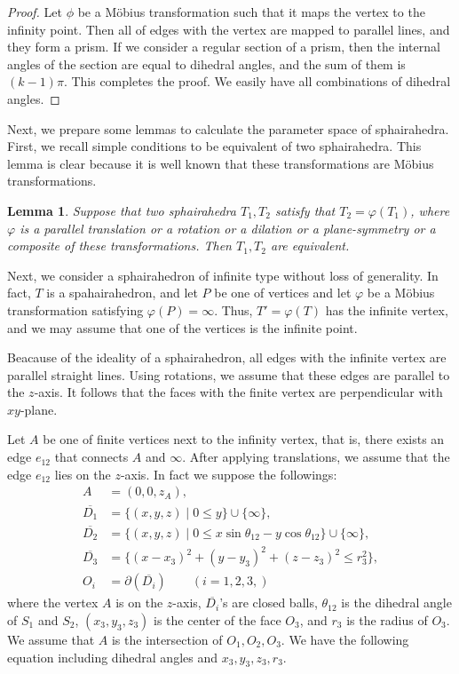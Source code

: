 \documentclass[suppldata, dvipdfmx]{interact}
\theoremstyle{plain}%
\newtheorem{lemma}[theorem]{Lemma}
\theoremstyle{definition}
\theoremstyle{remark}
\theoremstyle{problemstyle}
\begin{document}
\begin{proof}
 Let $\phi$ be a M\"obius transformation such that it maps the vertex to
 the infinity point. Then all of edges with the vertex are mapped to
 parallel lines, and they form a prism. If we consider a
 regular section of a prism, then the internal angles of the section 
 are equal to dihedral angles, and the sum of them is $(k-1)\pi$.  This
 completes the proof.  We easily have all combinations of dihedral angles.
\end{proof}

Next, we prepare some lemmas to calculate the parameter space of sphairahedra. First, we recall simple conditions to be equivalent of two sphairahedra.  This lemma is clear because it is well known that these transformations are M\"obius transformations. 

\begin{lemma} \label{lemma:equivalentOfSH}
Suppose that two sphairahedra $T_1, T_2$ satisfy that $T_2=\varphi(T_1)$, where $\varphi$ is a parallel translation or a rotation or a dilation or a plane-symmetry or a composite of these transformations.  Then $T_1, T_2$ are equivalent. 
\end{lemma}

Next, we consider a sphairahedron of infinite type without loss of generality.  In fact, $T$ is a spahairahedron, and  let $P$ be one of vertices and let $\varphi$ be a M\"obius transformation satisfying $\varphi(P)=\infty$.  Thus, $T'=\varphi(T)$ has the infinite vertex, and we may assume that one of the vertices is the infinite point.

Beacause of the ideality of a sphairahedron, all edges with the infinite vertex are parallel straight lines.  Using rotations, we assume that these edges are parallel to the $z$-axis.  It follows that the faces with the finite vertex are perpendicular with $xy$-plane.

Let $A$ be one of finite vertices next to the infinity vertex, that is, there exists an edge $e_{12}$ that connects $A$ and $\infty$.  After applying translations, we assume that the edge $e_{12}$ lies on the $z$-axis.  In fact we suppose the followings:
\begin{align*}
A &= (0,0,z_A),\\ 
\overline{D_1}  &= \{ (x,y,z) \mid 0 \le y \} \cup \{\infty\} ,\\
\overline{D_2}  &= \{ (x,y,z) \mid 0 \le x\sin\theta_{12} - y\cos\theta_{12} \}\cup \{\infty\} ,\\
\overline{D_3}  &= \{ (x-x_3)^2+(y-y_3)^2+(z-z_3)^2 \le r_3^2 \}, \\
O_i & = \partial(\overline{D_i}) \qquad(i=1,2,3,)
\end{align*}
where the vertex $A$ is on the $z$-axis, $\overline{D_i}$'s are closed balls, $\theta_{12}$ is the dihedral angle of $S_1$ and $S_2$,  $(x_3, y_3, z_3)$ is the center of the face $O_3$, and $r_3$ is the radius of $O_3$.  We assume that $A$ is the intersection of $O_1, O_2, O_3$.  We have the following equation including dihedral angles and  $x_3, y_3, z_3, r_3$.
\end{document}
